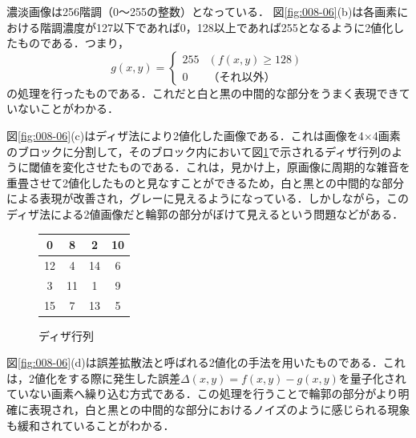 濃淡画像は256階調（0～255の整数）となっている．
%
図\ref{fig:008-06}(b)は各画素における階調濃度が127以下であれば0，128以上であれば255となるように2値化したものである．つまり，
\begin{equation}
g(x,y)=
\left \{
\begin{array}{cc}
255 & (f(x,y)\geq 128) \\
0 & （それ以外）
\end{array}
\right .
\end{equation}
の処理を行ったものである．これだと白と黒の中間的な部分をうまく表現できていないことがわかる．

図\ref{fig:008-06}(c)はディザ法により2値化した画像である．これは画像を4$\times$4画素のブロックに分割して，そのブロック内において図\ref{fig:dither_m}で示されるディザ行列のように閾値を変化させたものである．これは，見かけ上，原画像に周期的な雑音を重畳させて2値化したものと見なすことができるため，白と黒との中間的な部分による表現が改善され，グレーに見えるようになっている．しかしながら，このディザ法による2値画像だと輪郭の部分がぼけて見えるという問題などがある．

\begin{figure}[H]
\begin{center}
\begin{tabular}{|c|c|c|c|}
\hline
0 & 8 & 2 & 10 \\
\hline 
12 & 4 & 14 & 6 \\
\hline
3 & 11 & 1 & 9 \\
\hline
15 & 7 & 13 & 5 \\
\hline 
\end{tabular}
\end{center}
\caption{ディザ行列}
\label{fig:dither_m}
\end{figure}

図\ref{fig:008-06}(d)は誤差拡散法と呼ばれる2値化の手法を用いたものである．これは，2値化をする際に発生した誤差$\Delta(x,y)=f(x,y)-g(x,y)$を量子化されていない画素へ繰り込む方式である．この処理を行うことで輪郭の部分がより明確に表現され，白と黒との中間的な部分におけるノイズのように感じられる現象も緩和されていることがわかる．

